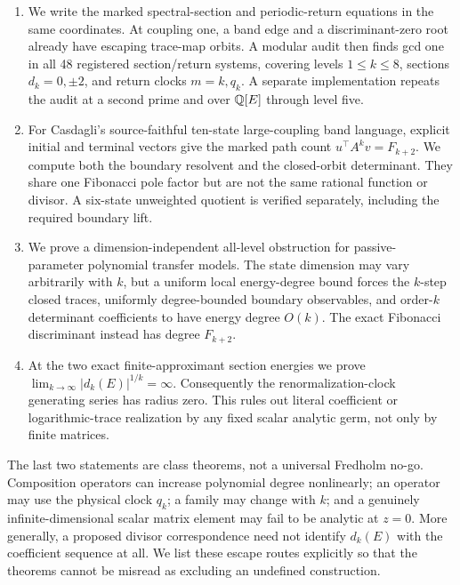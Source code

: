 \begin{enumerate}
\item We write the marked spectral-section and periodic-return equations in
the same coordinates.  At coupling one, a band edge and a discriminant-zero
root already have escaping trace-map orbits.  A modular audit then finds gcd
one in all 48 registered section/return systems, covering levels
\(1\le k\le8\), sections \(d_k=0,\pm2\), and return clocks \(m=k,q_k\).
A separate implementation repeats the audit at a second prime and over
\(\mathbb Q[E]\) through level five.

\item For Casdagli's source-faithful ten-state large-coupling band language,
explicit initial and terminal vectors give the marked path count
\(u^\top A^kv=F_{k+2}\).  We compute both the boundary resolvent and the
closed-orbit determinant.  They share one Fibonacci pole factor but are not
the same rational function or divisor.  A six-state unweighted quotient is
verified separately, including the required boundary lift.

\item We prove a dimension-independent all-level obstruction for passive-
parameter polynomial transfer models.  The state dimension may vary
arbitrarily with \(k\), but a uniform local energy-degree bound forces the
\(k\)-step closed traces, uniformly degree-bounded boundary observables, and
order-\(k\) determinant coefficients to have energy degree \(O(k)\).  The
exact Fibonacci discriminant instead has degree \(F_{k+2}\).

\item At the two exact finite-approximant section energies we prove
\(\lim_{k\to\infty}|d_k(E)|^{1/k}=\infty\).  Consequently the renormalization-clock
generating series has radius zero.  This rules out literal coefficient or
logarithmic-trace realization by any fixed scalar analytic germ, not only by
finite matrices.
\end{enumerate}

The last two statements are class theorems, not a universal Fredholm no-go.
Composition operators can increase polynomial degree nonlinearly; an operator
may use the physical clock \(q_k\); a family may change with \(k\); and a
genuinely infinite-dimensional scalar matrix element may fail to be analytic
at \(z=0\).  More generally, a proposed divisor correspondence need not
identify \(d_k(E)\) with the coefficient sequence at all.  We list these
escape routes explicitly so that the theorems cannot be misread as excluding
an undefined construction.

